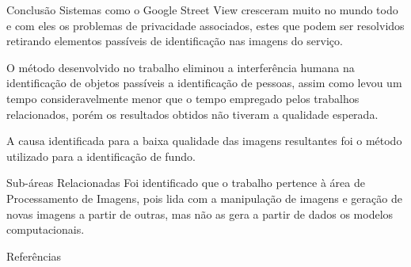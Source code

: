 \documentclass{beamer}
\begin{document}
    \begin{frame}{Conclusão}
        Sistemas como o Google Street View cresceram muito no mundo todo e com eles os problemas de privacidade associados, estes que podem ser resolvidos retirando elementos passíveis de identificação nas imagens do serviço.
        
        \vspace{\baselineskip}
        
        O método desenvolvido no trabalho eliminou a interferência humana na identificação de objetos passíveis a identificação de pessoas, assim como levou um tempo consideravelmente menor que o tempo empregado pelos trabalhos relacionados, porém os resultados obtidos não tiveram a qualidade esperada.
        
        \vspace{\baselineskip}
        
        A causa identificada para a baixa qualidade das imagens resultantes foi o método utilizado para a identificação de fundo.
    \end{frame}
    
    \begin{frame}{Sub-áreas Relacionadas}
        Foi identificado que o trabalho pertence à área de Processamento de Imagens, pois lida com a manipulação de imagens e geração de novas imagens a partir de outras, mas não as gera a partir de dados os modelos computacionais.
    \end{frame}

    \begin{frame}[allowframebreaks]{Referências}
        
    \end{frame}
    
\end{document}

